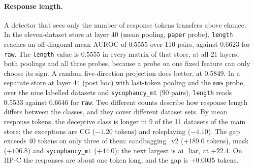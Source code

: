 \paragraph{Response length.}
A detector that sees only the number of response tokens transfers above chance.
In the eleven-dataset store at layer 40 (mean pooling, \texttt{paper} probe), \texttt{length} reaches an off-diagonal mean AUROC of 0.5555 over 110 pairs, against 0.6623 for \texttt{raw}. %
The \texttt{length} value is 0.5555 in every matrix of that store, at all 21 layers, both poolings and all three probes, because a probe on one fixed feature can only choose its sign. %
A random five-direction projection does better, at 0.5849. %
In a separate store at layer 44 (post hoc) with last-token pooling and the \texttt{mms} probe, over the nine labelled datasets and \texttt{sycophancy\_mt} (90 pairs), \texttt{length} reads 0.5533 against 0.6646 for \texttt{raw}. %
Two different counts describe how response length differs between the classes, and they cover different dataset sets.
By mean response tokens, the deceptive class is longer in 9 of the 11 datasets of the main store; the exceptions are CG ($-1.20$ tokens) and roleplaying ($-4.10$). %
The gap exceeds 40 tokens on only three of them: sandbagging\_v2 ($+189.0$ tokens), mask ($+106.8$) and \texttt{sycophancy\_mt} ($+44.0$); the next largest is ai\_liar, at $+22.4$. %
On HP-C the responses are about one token long, and the gap is $+0.0035$ tokens. %
